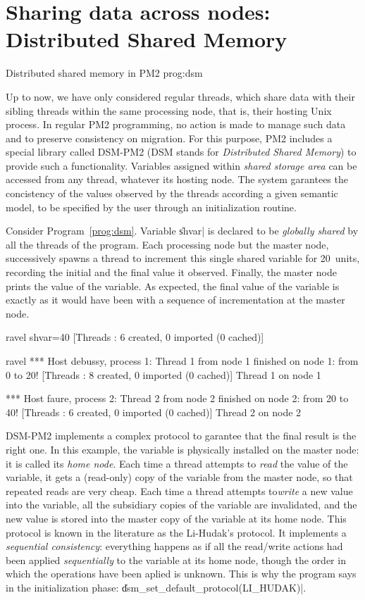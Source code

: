 \section{Sharing data across nodes: Distributed Shared Memory}

 {Distributed shared memory in PM2}
{prog:dsm}

Up to now, we have only considered regular threads, which share data
with their sibling threads within the same processing node, that is,
their hosting Unix process. In regular PM2 programming, no action is
made to manage such data and to preserve consistency on migration.
For this purpose, PM2 includes a special library called DSM-PM2 (DSM
stands for \emph{Distributed Shared Memory}) to provide such a
functionality. Variables assigned within \emph{shared storage area}
can be accessed from any thread, whatever its hosting node. The system
garantees the concistency of the values observed by the threads
according a given semantic model, to be specified by the user through
an initialization routine. 

Consider Program~\ref{prog:dsm}. Variable \|shvar| is declared to be
\emph{globally shared} by all the threads of the program.  Each
processing node but the master node, successively spawns a thread to
increment this single shared variable for 20~units, recording the
initial and the final value it observed.  Finally, the master node
prints the value of the variable.  As expected, the final value of the
variable is exactly as it would have been with a sequence of
incrementation at the master node.
\begin{shell}
ravel%
shvar=40
[Threads : 6 created, 0 imported (0 cached)]

ravel%
*** Host debussy, process 1:
Thread 1 from node 1 finished on node 1: from 0 to 20!
[Threads : 8 created, 0 imported (0 cached)]
Thread 1 on node 1

*** Host faure, process 2:
Thread 2 from node 2 finished on node 2: from 20 to 40!
[Threads : 6 created, 0 imported (0 cached)]
Thread 2 on node 2
\end{shell}

DSM-PM2 implements a complex protocol to garantee that the final
result is the right one. In this example, the variable is physically
installed on the master node: it is called its \emph{home node}. Each
time a thread attempts to \emph{read} the value of the variable, it
gets a (read-only) copy of the variable from the master node, so that
repeated reads are very cheap. Each time a thread attempts
to\emph{write} a new value into the variable, all the subsidiary
copies of the variable are invalidated, and the new value is stored
into the master copy of the variable at its home node. This protocol
is known in the literature as the Li-Hudak's protocol. It implements a
\emph{sequential consistency}: everything happens as if all the
read/write actions had been applied \emph{sequentially} to the
variable at its home node, though the order in which the operations
have been aplied is unknown. This is why the program says in the
initialization phase: \|dsm_set_default_protocol(LI_HUDAK)|.

